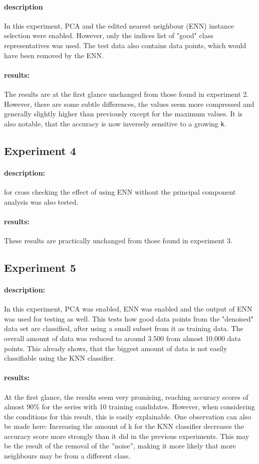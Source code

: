 \documentclass[10pt,a4paper]{proc}
\begin{document}
\paragraph{description}
In this experiment, PCA and the edited nearest neighbour (ENN) instance selection were enabled. However, only the indices list of "good" class representatives was used. The test data also contains data points, which would have been removed by the ENN.
\paragraph{results:} The results are at the first glance unchanged from those found in experiment 2. However, there are some subtle differences, the values seem more compressed and generally slightly higher than previously except for the maximum values. It is also notable, that the accuracy is now inversely sensitive to a growing \texttt{k}.

\FloatBarrier
\subsection{Experiment 4}\label{exp4}
\paragraph{description:} for cross checking the effect of using ENN without the principal component analysis was also tested.
\paragraph{results:} These results are practically unchanged from those found in experiment 3.

\FloatBarrier
\subsection{Experiment 5}\label{exp5}
\paragraph{description:}
In this experiment, PCA was enabled, ENN was enabled and the output of ENN was used for testing as well. This tests how good data points from the "denoised" data set are classified, after using a small subset from it as training data. The overall amount of data was reduced to around 3.500 from almost 10.000 data points. This already shows, that the biggest amount of data is not easily classifiable using the KNN classifier.
\paragraph{results:}
At the first glance, the results seem very promising, reaching accuracy scores of almost 90\% for the series with 10 training candidates. However, when considering the conditions for this result, this is easily explainable. One observation can also be made here: Increasing the amount of k for the KNN classifier decreases the accuracy score more strongly than it did in the previous experiments. This may be the result of the removal of the ''noise'', making it more likely that more neighbours may be from a different class.

\end{document}
